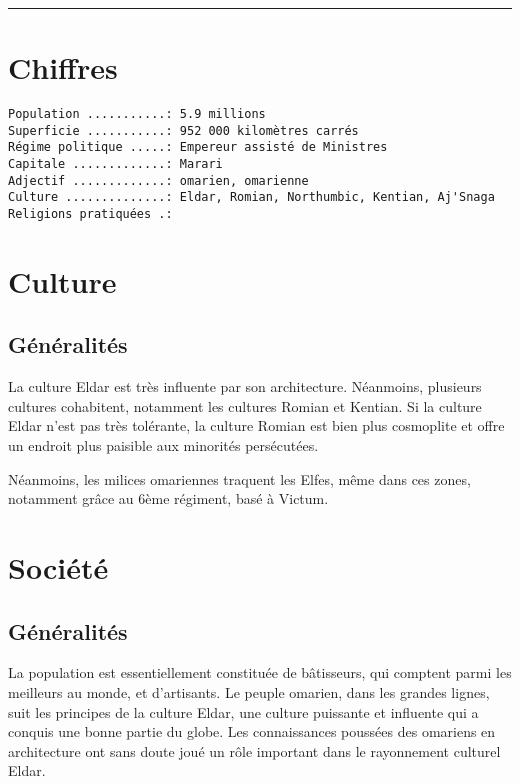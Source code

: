 \documentclass[french, a4paper, 12pt]{article}
\begin{document}
 \maketitle \vspace{3pt} \hrule \vspace{3pt}


\section{Chiffres}

\begin{verbatim}
Population ...........: 5.9 millions
Superficie ...........: 952 000 kilomètres carrés
Régime politique .....: Empereur assisté de Ministres
Capitale .............: Marari
Adjectif .............: omarien, omarienne
Culture ..............: Eldar, Romian, Northumbic, Kentian, Aj'Snaga
Religions pratiquées .:
\end{verbatim}

\section{Culture}

\subsection{Généralités}

La culture Eldar est très influente par son architecture. Néanmoins, plusieurs cultures cohabitent, notamment les cultures Romian et Kentian. Si la culture Eldar n'est pas très tolérante, la culture Romian est bien plus cosmoplite et offre un endroit plus paisible aux minorités persécutées.

Néanmoins, les milices omariennes traquent les Elfes, même dans ces zones, notamment grâce au 6ème régiment, basé à Victum.

\section{Société}

\subsection{Généralités}

La population est essentiellement constituée de bâtisseurs, qui comptent parmi les meilleurs au monde, et d'artisants. Le peuple omarien, dans les grandes lignes, suit les principes de la culture Eldar, une culture puissante et influente qui a conquis une bonne partie du globe. Les connaissances poussées des omariens en architecture ont sans doute joué un rôle important dans le rayonnement culturel Eldar.
\end{document}
